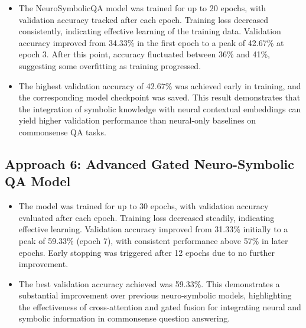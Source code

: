 \documentclass[10.5pt]{article}
\begin{document}
\begin{itemize}
    \item The NeuroSymbolicQA model was trained for up to 20 epochs, with validation accuracy tracked after each epoch. Training loss decreased consistently, indicating effective learning of the training data. Validation accuracy improved from 34.33\% in the first epoch to a peak of 42.67\% at epoch 3. After this point, accuracy fluctuated between 36\% and 41\%, suggesting some overfitting as training progressed.
    
    \item The highest validation accuracy of 42.67\% was achieved early in training, and the corresponding model checkpoint was saved. This result demonstrates that the integration of symbolic knowledge with neural contextual embeddings can yield higher validation performance than neural-only baselines on commonsense QA tasks.
    

\end{itemize}

\subsection{Approach 6: Advanced Gated Neuro-Symbolic QA Model}

\begin{itemize}
    \item The model was trained for up to 30 epochs, with validation accuracy evaluated after each epoch. Training loss decreased steadily, indicating effective learning. Validation accuracy improved from 31.33\% initially to a peak of 59.33\% (epoch 7), with consistent performance above 57\% in later epochs. Early stopping was triggered after 12 epochs due to no further improvement.
    
    \item The best validation accuracy achieved was 59.33\%. This demonstrates a substantial improvement over previous neuro-symbolic models, highlighting the effectiveness of cross-attention and gated fusion for integrating neural and symbolic information in commonsense question answering.

\end{itemize}

\newpage
\end{document}
